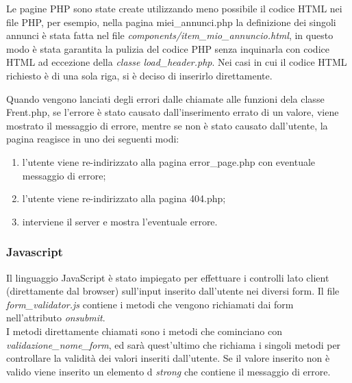 \documentclass[1_relazione.tex]{subfiles}
\begin{document}
    Le pagine PHP sono state create utilizzando meno possibile il codice HTML nei file PHP, per esempio, nella pagina miei_annunci.php la definizione dei singoli annunci \`{e} stata fatta nel file \textit{components/item_mio_annuncio.html}, in questo modo \`{e} stata garantita la pulizia del codice PHP senza inquinarla con codice HTML ad eccezione della \textit{classe load_header.php}. Nei casi in cui il codice HTML richiesto \`{e} di una sola riga, si \`{e} deciso di inserirlo direttamente.

    Quando vengono lanciati degli errori dalle chiamate alle funzioni dela classe Frent.php, se l'errore \`{e} stato causato dall'inserimento errato di un valore, viene mostrato il messaggio di errore, mentre se non \`{e} stato causato dall'utente, la pagina reagisce in uno dei seguenti modi:
    \begin{enumerate}
        \item l'utente viene re-indirizzato alla pagina error_page.php con eventuale messaggio di errore;
        \item l'utente viene re-indirizzato alla pagina 404.php;
        \item interviene il server e mostra l'eventuale errore.
    \end{enumerate}

    \subsubsection{Javascript}
    Il linguaggio JavaScript \`{e} stato impiegato per effettuare i controlli lato client (direttamente dal browser) sull'input inserito dall'utente nei diversi form.
    Il file \textit{form_validator.js} contiene i metodi che vengono richiamati dai form nell'attributo \textit{onsubmit}.\\
    I metodi direttamente chiamati sono i metodi che cominciano con \textit{validazione_nome_form}, ed sar\`{a} quest'ultimo che richiama i singoli metodi per controllare la validit\`{a} dei valori inseriti dall'utente.
    Se il valore inserito non \`{e} valido viene inserito un elemento d \textit{strong} che contiene il messaggio di errore.
\end{document}
